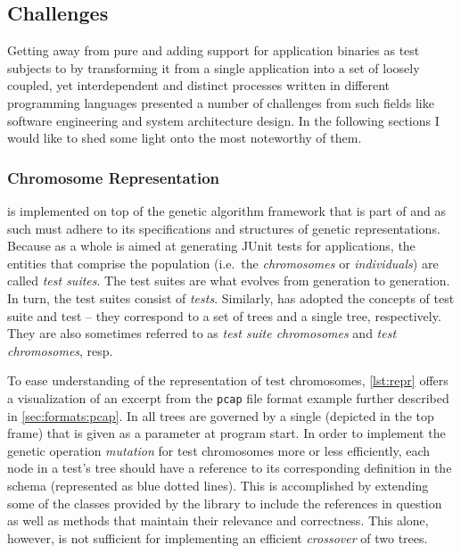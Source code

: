 \subsection{Challenges}
Getting away from pure \java and adding support for application binaries as test subjects 
to \xmlmate by transforming it from 
a single \java application into a set of loosely coupled, yet interdependent and distinct 
processes written in different programming languages presented a number of challenges from 
such fields like software engineering and system architecture design. 
In the following sections I would like to shed some light onto 
the most noteworthy of them.
\subsubsection{Chromosome Representation}
\label{sec:repr}
\xmlmate is implemented on top of the genetic algorithm framework that is part of 
\evosuite{}\cite{fraser2013whole} and as such must adhere to its specifications and structures 
of genetic representations. 
Because \evosuite as a whole is aimed at generating {\small JUnit} tests for \java applications, 
the entities that comprise the population  (i.e.\ the \emph{chromosomes} or \emph{individuals}) 
are called \emph{test suites}. The test suites are what evolves from generation to generation.
In turn, the test suites consist of \emph{tests}. Similarly, \xmlmate has adopted the concepts of 
test suite and test -- they correspond to a set of \xml trees and a single \xml tree, respectively. 
They are also sometimes referred to as \emph{test suite chromosomes} and \emph{test chromosomes}, resp.

To ease understanding of the representation of \xml test chromosomes, \cref{lst:repr} offers a
visualization of an excerpt from the \texttt{pcap} file format example further described in
\cref{sec:formats:pcap}. In \xmlmate all \xml trees are governed by a single \xsd (depicted in the top frame)
that is given as a parameter at program start. In order to implement the genetic operation \emph{mutation} for
test chromosomes more or less efficiently, each node in a test's \xml tree should have a reference to its
corresponding definition in the schema (represented as blue dotted lines). This is accomplished by extending
some of the \java classes provided by the \xom library to include the references in question as well as methods
that maintain their relevance and correctness. This alone, however, is not sufficient for implementing an
efficient \emph{crossover} of two \xml trees.

